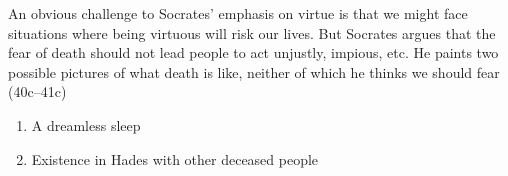 \documentclass[oneside]{article}
\begin{document}
An obvious challenge to Socrates' emphasis on virtue is that we might face situations where being virtuous will risk our lives. But Socrates  argues that the fear of death should not lead people to act unjustly, impious, etc. He paints two possible pictures of what death is like, neither of which he thinks we should fear (40c--41c)

\begin{enumerate}\item{A dreamless sleep}\item{Existence in Hades with other deceased people}\end{enumerate}
\end{document}
